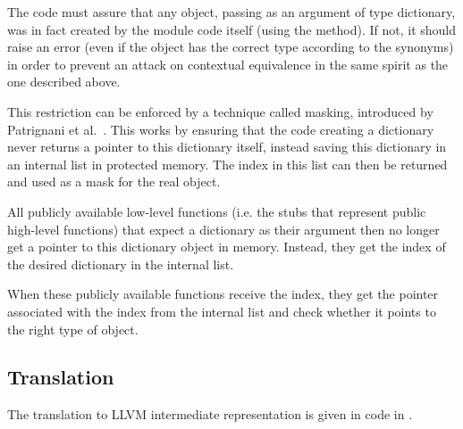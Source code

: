 The code must assure that any object, passing as an argument of type dictionary, was in fact created by the module code itself (using the  method). If not, it should raise an error (even if the object has the correct type according to the synonyms) in order to prevent an attack on contextual equivalence in the same spirit as the one described above.

This restriction can be enforced by a technique called masking, introduced by Patrignani et al.~\cite{Patrignani}. 
This works by ensuring that the code creating a dictionary never returns a pointer to this dictionary itself, instead saving this dictionary in an internal list in protected memory.
The index in this list can then be returned and used as a mask for the real object.

All publicly available low-level functions (i.e. the stubs that represent public high-level functions) that expect a dictionary as their argument then no longer get a pointer to this dictionary object in memory. 
Instead, they get the index of the desired dictionary in the internal list.

When these publicly available functions receive the index, they get the pointer associated with the index from the internal list and check whether it points to the right type of object.
%
%

\subsection{Translation}
\label{sec:TranslatedExample}
The translation to LLVM intermediate representation is given in code in .

